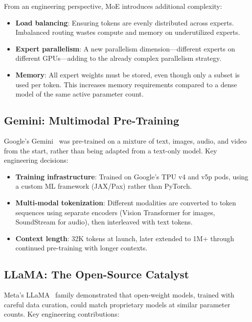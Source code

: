 From an engineering perspective, MoE introduces additional complexity:
\begin{itemize}[leftmargin=*]
    \item \textbf{Load balancing}: Ensuring tokens are evenly distributed across experts. Imbalanced routing wastes compute and memory on underutilized experts.
    \item \textbf{Expert parallelism}: A new parallelism dimension---different experts on different GPUs---adding to the already complex parallelism strategy.
    \item \textbf{Memory}: All expert weights must be stored, even though only a subset is used per token. This increases memory requirements compared to a dense model of the same active parameter count.
\end{itemize}

\subsection{Gemini: Multimodal Pre-Training}

Google's Gemini~\cite{geminiteam2024gemini} was pre-trained on a mixture of text, images, audio, and video from the start, rather than being adapted from a text-only model. Key engineering decisions:

\begin{itemize}[leftmargin=*]
    \item \textbf{Training infrastructure}: Trained on Google's TPU v4 and v5p pods, using a custom ML framework (JAX/Pax) rather than PyTorch.
    \item \textbf{Multi-modal tokenization}: Different modalities are converted to token sequences using separate encoders (Vision Transformer for images, SoundStream for audio), then interleaved with text tokens.
    \item \textbf{Context length}: 32K tokens at launch, later extended to 1M+ through continued pre-training with longer contexts.
\end{itemize}

\subsection{LLaMA: The Open-Source Catalyst}

Meta's LLaMA~\cite{touvron2023llama} family demonstrated that open-weight models, trained with careful data curation, could match proprietary models at similar parameter counts. Key engineering contributions:

